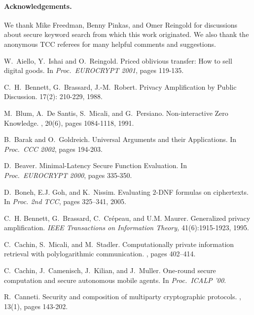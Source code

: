 \documentclass[11pt]{article}
\begin{document}
\paragraph{Acknowledgements.} We thank Mike Freedman, Benny
Pinkas, and Omer Reingold for discussions about secure keyword
search from which this work originated. We also thank the anonymous
TCC referees for many helpful comments and suggestions.


\begin{thebibliography}{10}
W.~Aiello, Y.~Ishai and O.~Reingold.
\newblock Priced oblivious transfer: How to sell digital goods.
\newblock In {\em Proc.\ EUROCRYPT 2001}, pages 119-135.

 C.~H.~Bennett, G.~Brassard, J.-M.~Robert.
\newblock Privacy Amplification by Public Discussion.
 17(2): 210-229, 1988.

M.~Blum, A.~De Santis, S.~Micali, and G.~Persiano.
\newblock Non-interactive Zero Knowledge.
, 20(6), pages 1084-1118,
1991.

B.~Barak and O.~Goldreich.
\newblock  Universal Arguments and their
Applications.
\newblock In {\em Proc.\ CCC 2002}, pages 194-203.

D.~Beaver.
\newblock Minimal-Latency Secure Function Evaluation.
\newblock In {\em Proc.\ EUROCRYPT 2000}, pages 335-350.

D.~Boneh, E.J. Goh, and K.~Nissim.
\newblock Evaluating $2$-{DNF} formulas on ciphertexts.
\newblock In {\em Proc. 2nd TCC}, pages 325--341, 2005.

 C.~H. Bennett, G.~Brassard, C.~Cr{\'e}peau, and U.M.
Maurer.
\newblock Generalized privacy amplification. {\em IEEE Transactions on
Information Theory,} 41(6):1915-1923, 1995.

C.~Cachin, S.~Micali, and M.~Stadler.
\newblock Computationally private information retrieval with polylogarithmic
  communication.
, pages 402--414.

C.~Cachin, J.~Camenisch, J.~Kilian, and J.~Muller.
\newblock One-round secure computation and secure autonomous mobile agents.
\newblock In {\em Proc.\ ICALP '00}.

R.~Canneti.
\newblock Security and composition of multiparty cryptographic protocols.
, 13(1), pages 143-202.


\end{thebibliography}
\end{document}
